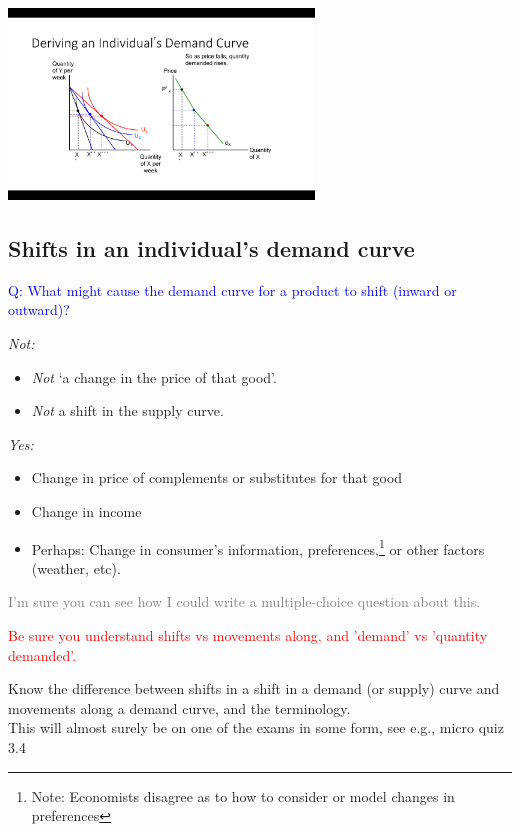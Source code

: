 \documentclass[]{article}
\providecommand{\tightlist}{%
  \setlength{\itemsep}{0pt}\setlength{\parskip}{0pt}}
\begin{document}
\includegraphics[height=2in]{picsfigs/dmd4.png}

\hypertarget{shifts-in-an-individuals-demand-curve}{%
\subsection{Shifts in an individual's demand
curve}\label{shifts-in-an-individuals-demand-curve}}

\textcolor{blue}{Q:  What might cause the demand curve for a product to shift (inward or outward)?}

\emph{Not:}

\begin{itemize}
\tightlist
\item
  \emph{Not} `a change in the price of that good'.
\item
  \emph{Not} a shift in the supply curve.
\end{itemize}

\emph{Yes:}

\begin{itemize}
\tightlist
\item
  Change in price of complements or substitutes for that good
\item
  Change in income
\item
  Perhaps: Change in consumer's information, preferences,\footnote{Note:
    Economists disagree as to how to consider or model changes in
    preferences} or other factors (weather, etc).
\end{itemize}

\textcolor{gray}{ I'm sure you can see how I could write a multiple-choice question about this.}

\textcolor{red}{Be sure you understand shifts vs movements along, and 'demand' vs 'quantity demanded'.}

Know the difference between shifts in a shift in a demand (or supply)
curve and movements along a demand curve, and the terminology.\\
This will almost surely be on one of the exams in some form, see e.g.,
micro quiz 3.4\\
\end{document}
